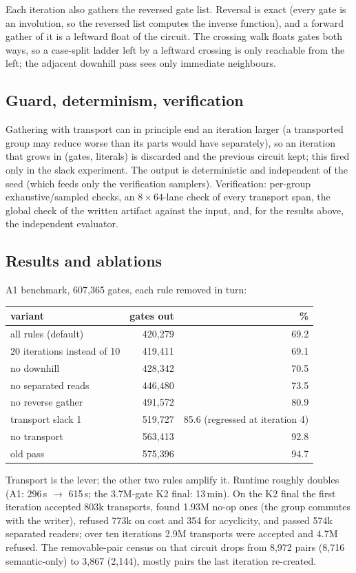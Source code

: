 \documentclass[11pt]{article}
\begin{document}
Each iteration also gathers the reversed gate list. Reversal is exact (every gate is an
involution, so the reversed list computes the inverse function), and a forward gather of it
is a leftward float of the circuit. The crossing walk floats gates both ways, so a case-split
ladder left by a leftward crossing is only reachable from the left; the adjacent downhill
pass sees only immediate neighbours.

\subsection{Guard, determinism, verification}

Gathering with transport can in principle end an iteration larger (a transported group may
reduce worse than its parts would have separately), so an iteration that grows in (gates,
literals) is discarded and the previous circuit kept; this fired only in the slack experiment.
The output is deterministic and independent of the seed (which feeds only the verification
samplers). Verification: per-group exhaustive/sampled checks, an $8\times 64$-lane check of
every transport span, the global check of the written artifact against the input, and, for
the results above, the independent evaluator.

\subsection{Results and ablations}

A1 benchmark, 607,365 gates, each rule removed in turn:
\begin{center}\small
\begin{tabular}{lrr}\toprule
variant & gates out & \%\\\midrule
all rules (default) & 420,279 & 69.2\\
20 iterations instead of 10 & 419,411 & 69.1\\
no downhill & 428,342 & 70.5\\
no separated reads & 446,480 & 73.5\\
no reverse gather & 491,572 & 80.9\\
transport slack 1 & 519,727 & 85.6 (regressed at iteration 4)\\
no transport & 563,413 & 92.8\\
old pass & 575,396 & 94.7\\
\bottomrule\end{tabular}
\end{center}
Transport is the lever; the other two rules amplify it. Runtime roughly doubles (A1: 296\,s
$\to$ 615\,s; the 3.7M-gate K2 final: 13\,min). On the K2 final the first iteration accepted
803k transports, found 1.93M no-op ones (the group commutes with the writer), refused 773k on
cost and 354 for acyclicity, and passed 574k separated readers; over ten iterations 2.9M
transports were accepted and 4.7M refused. The removable-pair census on that circuit drops
from 8,972 pairs (8,716 semantic-only) to 3,867 (2,144), mostly pairs the last iteration
re-created.
\end{document}
